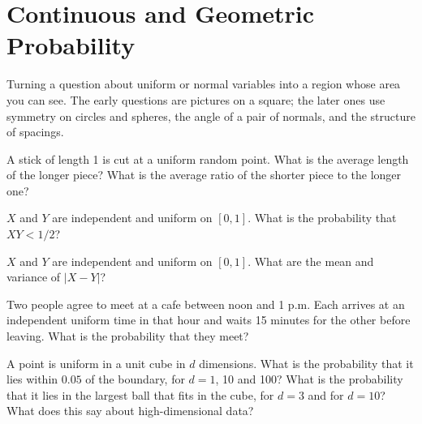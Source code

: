 \chapter{Continuous and Geometric Probability}\label{ch:iv1:continuous-and-geometric-probability}

\begin{ivtrains}
Turning a question about uniform or normal variables into a region whose area you can see. The early questions are pictures on a square; the later ones use symmetry on circles and spheres, the angle of a pair of normals, and the structure of spacings.
\end{ivtrains}

\begin{question}\label{iq:iv1:continuous-and-geometric-probability:1}
A stick of length 1 is cut at a uniform random point. What is the average length of the longer piece? What is the average ratio of the shorter piece to the longer one?
\end{question}

\begin{question}\label{iq:iv1:continuous-and-geometric-probability:2}
$X$ and $Y$ are independent and uniform on $[0, 1]$. What is the probability that $XY < 1/2$?
\end{question}

\begin{question}\label{iq:iv1:continuous-and-geometric-probability:3}
$X$ and $Y$ are independent and uniform on $[0, 1]$. What are the mean and variance of $|X - Y|$?
\end{question}

\begin{question}\label{iq:iv1:continuous-and-geometric-probability:4}
Two people agree to meet at a cafe between noon and 1 p.m. Each arrives at an independent uniform time in that hour and waits 15 minutes for the other before leaving. What is the probability that they meet?
\end{question}

\begin{question}\label{iq:iv1:continuous-and-geometric-probability:5}
A point is uniform in a unit cube in $d$ dimensions. What is the probability that it lies within $0.05$ of the boundary, for $d = 1$, 10 and 100? What is the probability that it lies in the largest ball that fits in the cube, for $d = 3$ and for $d = 10$? What does this say about high-dimensional data?
\end{question}


